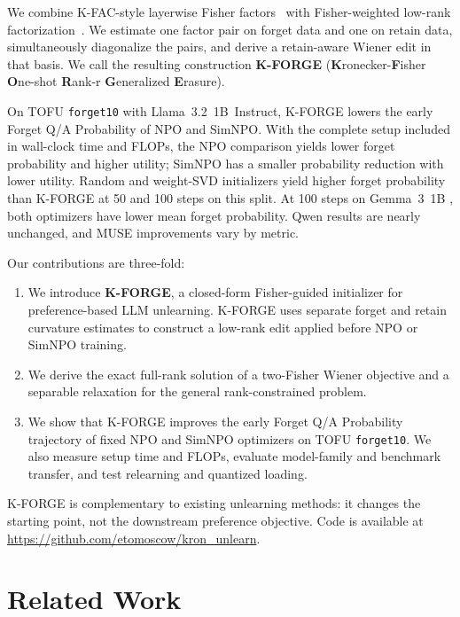 \documentclass[11pt]{article}
\begin{document}
We combine K-FAC-style layerwise Fisher factors~\citep{martens2015optimizing} with Fisher-weighted low-rank factorization~\citep{chekalina_2026_gfwsvd}. We estimate one factor pair on forget data and one on retain data, simultaneously diagonalize the pairs, and derive a retain-aware Wiener edit in that basis. We call the resulting construction \textbf{K-FORGE} (\textbf{K}ronecker-\textbf{F}isher \textbf{O}ne-shot \textbf{R}ank-r \textbf{G}eneralized \textbf{E}rasure).

On TOFU \texttt{forget10} with Llama~3.2~1B~Instruct, K-FORGE lowers the early Forget Q/A Probability of NPO and SimNPO.
With the complete setup included in wall-clock time and FLOPs, the NPO comparison yields lower forget probability and higher utility; SimNPO has a smaller probability reduction with lower utility. Random and weight-SVD initializers yield higher forget probability than K-FORGE at 50 and 100 steps on this split. At 100 steps on Gemma~3~1B , both optimizers have lower mean forget probability.
Qwen results are nearly unchanged, and MUSE improvements vary by metric.

Our contributions are three-fold:
\begin{enumerate}
    \item We introduce \textbf{K-FORGE}, a closed-form Fisher-guided initializer for preference-based LLM unlearning. K-FORGE uses separate forget and retain curvature estimates to construct a low-rank edit applied before NPO or SimNPO training.
    
    \item We derive the exact full-rank solution of a two-Fisher Wiener objective and a separable relaxation for the general rank-constrained problem.
    
    \item We show that K-FORGE improves the early Forget Q/A Probability trajectory of fixed NPO and SimNPO optimizers on TOFU \texttt{forget10}. We also measure setup time and FLOPs, evaluate model-family and benchmark transfer, and test relearning and quantized loading.
\end{enumerate}
  
K-FORGE is complementary to existing unlearning methods: it changes the starting point, not the downstream preference objective. Code is available at \url{https://github.com/etomoscow/kron_unlearn}.


\section{Related Work}
\end{document}
